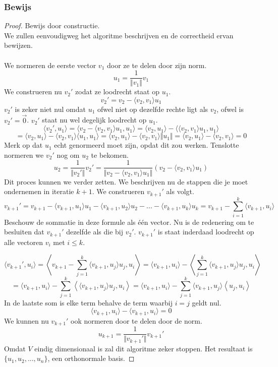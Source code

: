 \documentclass[lineaire_algebra_oplossingen.tex]{subfiles}
\begin{document}
\subsubsection*{Bewijs}
\begin{proof}
Bewijs door constructie.\\
We zullen eenvoudigweg het algoritme beschrijven en de correctheid ervan bewijzen.\\\\
We normeren de eerste vector $v_1$ door ze te delen door zijn norm.
\[
u_1 = \frac{1}{\Vert v_1\Vert}v_1
\]
We construeren nu $v_2'$ zodat ze loodrecht staat op $u_1$.
\[
v_2' = v_2 - \langle v_2,v_1\rangle u_1
\]
$v_2'$ is zeker niet nul omdat $u_1$ ofwel niet op dezelfde rechte ligt als $v_2$, ofwel is $v_2' = \vec{0}$. $v_2'$ staat nu wel degelijk loodrecht op $u_1$.
\[
\langle v_2',u_1\rangle = \langle v_2 - \langle v_2,v_1\rangle u_1,u_1\rangle = \langle v_2,u_1\rangle - \langle\langle v_2,v_1\rangle u_1,u_1\rangle
\]
\[
= \langle v_2,u_1\rangle - \langle v_2,v_1\rangle \langle u_1,u_1\rangle = \langle v_2,u_1\rangle - \langle v_2,v_1\rangle \Vert u_1\Vert = \langle v_2,u_1\rangle - \langle v_2,v_1\rangle = 0
\]
Merk op dat $u_1$ echt genormeerd moet zijn, opdat dit zou werken. Tenslotte normeren we $v_2'$ nog om $u_2$ te bekomen.
\[
u_2 = \frac{1}{\Vert v_2'\Vert}v_2' = \frac{1}{\Vert v_2 - \langle v_2,v_1\rangle u_1\Vert}(v_2 - \langle v_2,v_1\rangle u_1)
\]
Dit proces kunnen we verder zetten. We beschrijven nu de stappen die je moet ondernemen in iteratie $k+1$.
We construeren $v_{k+1}'$ als volgt.
\[
v_{k+1}' = v_{k+1} - \langle v_{k+1},u_1 \rangle u_1 - \langle v_{k+1},u_2 \rangle u_2 - ... - \langle v_{k+1},u_k \rangle u_k
= v_{k+1} - \sum_{i=1}^k \langle v_{k+1},u_i \rangle
\]
Beschouw de sommatie in deze formule als \'e\'en vector. Nu is de redenering om te besluiten dat $v_{k+1}'$ dezelfde als die bij $v_2'$.
$v_{k+1}'$ is staat inderdaad loodrecht op alle vectoren $v_i$ met $i\le k$.

\[
\langle v_{k+1}',u_i\rangle  = \left\langle v_{k+1} - \sum_{j=1}^k \langle v_{k+1},u_j \rangle u_j,u_i\right\rangle
=
\langle v_{k+1},u_i\rangle -
\left\langle \sum_{j=1}^k \langle v_{k+1},u_j \rangle u_j,u_i\right\rangle
\]
\[
=
\langle v_{k+1},u_i\rangle -
\sum_{j=1}^k
\left\langle  \langle v_{k+1},u_j \rangle u_j,u_i\right\rangle
=
\langle v_{k+1},u_i\rangle -
\sum_{j=1}^k
\langle v_{k+1},u_j \rangle
\left\langle u_j,u_i\right\rangle
\]
In de laatste som is elke term behalve de term waarbij $i=j$ geldt nul.
\[
\langle v_{k+1},u_i\rangle -
\langle v_{k+1},u_i\rangle
=0
\]
We kunnen nu $v_{k+1}'$ ook normeren door te delen door de norm.
\[
u_{k+1} = \frac{1}{\Vert v_{k+1}'\Vert}v_{k+1}'
\]
Omdat $V$ eindig dimensionaal is zal dit algoritme zeker stoppen. Het resultaat is $\{u_1,u_2,...,u_n\}$, een orthonormale basis.
\end{proof}
\end{document}
